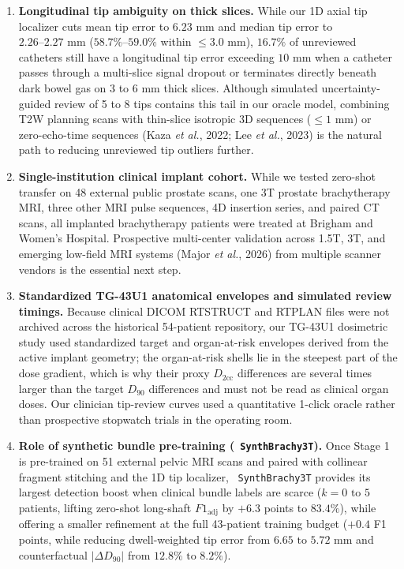 \documentclass[
  11pt,
]{article}
\providecommand{\tightlist}{%
  \setlength{\itemsep}{0pt}\setlength{\parskip}{0pt}}
\let\nforigtexttt\texttt
\renewcommand{\texttt}[1]{\nforigtexttt{\XeTeXinterchartokenstate=1 #1}}
\begin{document}
\begin{enumerate}
\def\labelenumi{\arabic{enumi}.}
\tightlist
\item
  \textbf{Longitudinal tip ambiguity on thick slices.} While our 1D
  axial tip localizer cuts mean tip error to \(6.23\text{ mm}\) and
  median tip error to \(2.26\text{--}2.27\text{ mm}\)
  (\(58.7\%\text{--}59.0\%\) within \(\le 3.0\text{ mm}\)), \(16.7\%\)
  of unreviewed catheters still have a longitudinal tip error exceeding
  \(10\text{ mm}\) when a catheter passes through a multi-slice signal
  dropout or terminates directly beneath dark bowel gas on 3 to 6 mm
  thick slices. Although simulated uncertainty-guided review of 5 to 8
  tips contains this tail in our oracle model, combining T2W planning
  scans with thin-slice isotropic 3D sequences (\(\le 1\text{ mm}\)) or
  zero-echo-time sequences (Kaza \emph{et al.}, 2022; Lee \emph{et al.},
  2023) is the natural path to reducing unreviewed tip outliers further.
\item
  \textbf{Single-institution clinical implant cohort.} While we tested
  zero-shot transfer on 48 external public prostate scans, one 3T
  prostate brachytherapy MRI, three other MRI pulse sequences, 4D
  insertion series, and paired CT scans, all implanted brachytherapy
  patients were treated at Brigham and Women's Hospital. Prospective
  multi-center validation across 1.5T, 3T, and emerging low-field MRI
  systems (Major \emph{et al.}, 2026) from multiple scanner vendors is
  the essential next step.
\item
  \textbf{Standardized TG-43U1 anatomical envelopes and simulated review
  timings.} Because clinical DICOM RTSTRUCT and RTPLAN files were not
  archived across the historical 54-patient repository, our TG-43U1
  dosimetric study used standardized target and organ-at-risk envelopes
  derived from the active implant geometry; the organ-at-risk shells lie
  in the steepest part of the dose gradient, which is why their proxy
  \(D_{2\text{cc}}\) differences are several times larger than the
  target \(D_{90}\) differences and must not be read as clinical organ
  doses. Our clinician tip-review curves used a quantitative 1-click
  oracle rather than prospective stopwatch trials in the operating room.
\item
  \textbf{Role of synthetic bundle pre-training
  (\texttt{SynthBrachy3T}).} Once Stage 1 is pre-trained on 51 external
  pelvic MRI scans and paired with collinear fragment stitching and the
  1D tip localizer, \texttt{SynthBrachy3T} provides its largest
  detection boost when clinical bundle labels are scarce
  (\(k = 0\text{ to }5\) patients, lifting zero-shot long-shaft
  \(F1_{\text{adj}}\) by \(+6.3\) points to \(83.4\%\)), while offering
  a smaller refinement at the full 43-patient training budget (\(+0.4\)
  F1 points, while reducing dwell-weighted tip error from
  \(6.65\text{ to }5.72\text{ mm}\) and counterfactual
  \(|\Delta D_{90}|\) from \(12.8\%\text{ to }8.2\%\)).
\end{enumerate}
\end{document}
